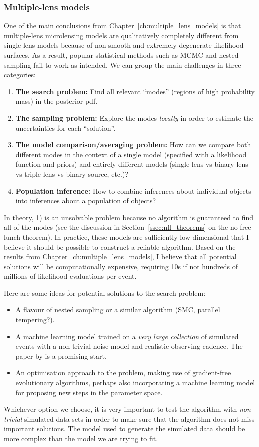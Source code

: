 \documentclass[12pt,dvipsnames]{report}
\begin{document}
\subsubsection{Multiple-lens models}
One of the main conclusions from Chapter~\ref{ch:multiple_lens_models} is that multiple-lens 
microlensing models are qualitatively completely different from single lens models because 
of non-smooth and extremely degenerate likelihood surfaces. As a result, popular statistical 
methods such as MCMC and nested sampling fail to work as intended. We can group the main challenges
in three categories:
\begin{enumerate}
    \item \textbf{The search problem:} Find all relevant ``modes'' (regions of high probability mass)
    in the posterior pdf.     
\item \textbf{The sampling problem:} Explore the modes \emph{locally} in order to estimate 
    the uncertainties for each ``solution''. 
\item \textbf{The model comparison/averaging problem:} How can we compare both different 
modes in the context of a single model (specified with a likelihood function and priors) and entirely 
different models (single lens vs binary lens vs triple-lens vs binary source, etc.)?
\item \textbf{Population inference:} How to combine inferences about individual objects 
into inferences about a population of objects?
\end{enumerate}
In theory, 1) is an unsolvable problem because no algorithm 
is guaranteed to find all of the modes (see the discussion in Section~\ref{ssec:nfl_theorems}
on the no-free-lunch theorem). In practice, these models are sufficiently low-dimensional
that I believe it should be possible to construct a reliable algorithm. Based on the 
results from Chapter~\ref{ch:multiple_lens_models}, I believe that all potential solutions will be 
computationally expensive, requiring 10s if not hundreds of millions of likelihood 
evaluations per event. 

Here are some ideas for potential solutions to the search problem:
\begin{itemize}
    \item A flavour of nested sampling or a similar algorithm (SMC, parallel tempering?).
    \item A machine learning model trained on a \emph{very large collection} of simulated events with 
    a non-trivial noise model and realistic observing cadence. 
    The paper by \citet{https://arxiv.org/abs/2206.08199} is a promising start.
    \item An optimisation approach to the problem, making use of gradient-free evolutionary 
    algorithms, perhaps also incorporating a machine learning model for proposing new 
    steps in the parameter space.
\end{itemize}
Whichever option we choose, it is very important to test the algorithm with 
\emph{non-trivial} simulated data sets in order to make sure that the algorithm 
does not miss important solutions. The model used to generate the simulated data should 
be more complex than the model we are trying to fit.
\end{document}
